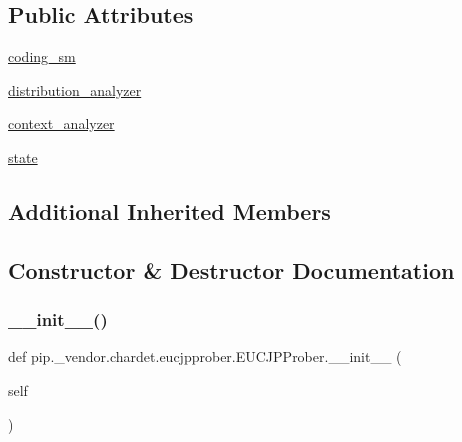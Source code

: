 \subsection*{Public Attributes}
\begin{DoxyCompactItemize}
\item 
\hyperlink{classpip_1_1__vendor_1_1chardet_1_1eucjpprober_1_1EUCJPProber_a4604555010b3262699ea739240454a3b}{coding\+\_\+sm}
\item 
\hyperlink{classpip_1_1__vendor_1_1chardet_1_1eucjpprober_1_1EUCJPProber_a75b64d956a8a61f04480e3102c5a0401}{distribution\+\_\+analyzer}
\item 
\hyperlink{classpip_1_1__vendor_1_1chardet_1_1eucjpprober_1_1EUCJPProber_a585c292f7ee1225734a90af4dd1a1b81}{context\+\_\+analyzer}
\item 
\hyperlink{classpip_1_1__vendor_1_1chardet_1_1eucjpprober_1_1EUCJPProber_a1f799e0eaf10a455a26015ca0363c107}{state}
\end{DoxyCompactItemize}
\subsection*{Additional Inherited Members}


\subsection{Constructor \& Destructor Documentation}
\mbox{\label{classpip_1_1__vendor_1_1chardet_1_1eucjpprober_1_1EUCJPProber_aad9e0c27be728bc74ee4e7a8ae4d5f2a}} 
\subsubsection{\texorpdfstring{\+\_\+\+\_\+init\+\_\+\+\_\+()}{\_\_init\_\_()}}
{\footnotesize\ttfamily def pip.\+\_\+vendor.\+chardet.\+eucjpprober.\+E\+U\+C\+J\+P\+Prober.\+\_\+\+\_\+init\+\_\+\+\_\+ (\begin{DoxyParamCaption}\item[{}]{self }\end{DoxyParamCaption})}




